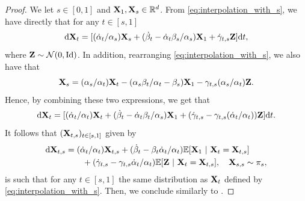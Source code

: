 \documentclass{article}
\begin{document}
\begin{proof}
We let $s \in [0,1]$ and $\mathbf{X}_1, \mathbf{X}_s \in \mathbb{R}^d$. From \eqref{eq:interpolation_with_s}, we have directly that for any $t \in [s,1]$
\begin{equation}
    \mathrm{d} \mathbf{X}_t = [(\dot{\alpha}_t / \alpha_s) \mathbf{X}_s + (\dot{\beta}_t - \dot{\alpha}_t \beta_s / \alpha_s) \mathbf{X}_1 + \dot{\gamma}_{t,s} \mathbf{Z}] \mathrm{d} t ,
\end{equation}
where $\mathbf{Z} \sim \mathcal{N}(0, \mathrm{Id})$. In addition, rearranging \eqref{eq:interpolation_with_s}, we also have that 
\begin{equation}
    \mathbf{X}_s = (\alpha_s / \alpha_t) \mathbf{X}_t - (\alpha_s \beta_t / \alpha_t - \beta_s) \mathbf{X}_1 - \gamma_{t,s} (\alpha_s / \alpha_t) \mathbf{Z} .  
\end{equation}
Hence, by combining these two expressions, we get that 
\begin{equation}
    \mathrm{d} \mathbf{X}_t = [(\dot{\alpha}_t / \alpha_t) \mathbf{X}_t + (\dot{\beta}_t - \dot{\alpha}_t \beta_t / \alpha_s) \mathbf{X}_1 + (\dot{\gamma}_{t,s} - \gamma_{t,s}(\dot{\alpha}_t / \alpha_t)) \mathbf{Z}] \mathrm{d} t .
\end{equation}
It follows that $(\mathbf{X}_{t,s})_{t \in [s,1]}$ given by 
\begin{align}
\label{eq:stochastic_flow_determistic_rewrite_appendix}
    \rmd \bfX_{t,s} &= (\dot{\alpha}_t/\alpha_t) \bfX_{t,s} + (\dot{\beta}_t - \beta_t \dot{\alpha}_t / \alpha_t) \mathbb{E}[ \bfX_1 \ | \ \bfX_t = \bfX_{t,s}] \\
    & \qquad + (\dot{\gamma}_{t,s} - \gamma_{t,s} \dot{\alpha}_t/\alpha_t) \mathbb{E}[ \bfZ \ | \ \bfX_t = \bfX_{t,s}]  , \quad \bfX_{s,s} \sim \pi_s ,
\end{align}
is such that for any $t\in [s,1]$ the same distribution as $\mathbf{X}_t$ defined by \eqref{eq:interpolation_with_s}. Then, we conclude similarly to \citep[Theorem 2.8, Corollary 2.10]{albergo2023stochastic}.
\end{proof}
\end{document}
